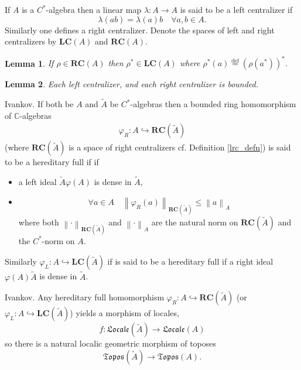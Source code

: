 \documentclass{beamer}
\theoremstyle{plain}
\newtheorem{lem}{Lemma}%
\newcommand{\bean}{\begin{eqnarray*}}
\newcommand{\eean}{\end{eqnarray*}}
\newcommand{\be}{\begin{equation}}
\newcommand{\ee}{\end{equation}}
\newcommand{\C}{\mathbb{C}}
\newcommand{\la}{\lambda}
\newcommand{\bydef}{\stackrel{\mathrm{def}}{=}}
\newcommand{\hookto}{\hookrightarrow}        %
\begin{document}
\begin{frame}
	\begin{definition}\label{lrc_defn}
	If $A$ is a $C^*$-algebra then a linear map $\la: A\to A$ is said to be a \alert{left centralizer} if
	\be
	\la\left(ab\right)= 	\la\left(a\right) b \quad \forall a, b \in A.
	\ee
	Similarly one defines a \alert{right} centralizer. Denote the spaces of left and right centralizers by $\mathbf{LC}(A)$ and  $\mathbf{RC}(A)$.
\end{definition}
\begin{lem}
	If $\rho\in  \mathbf{RC}(A)$ then $\rho^*\in  \mathbf{LC}(A)$ where $\rho^*\left(a \right)\bydef \left(\rho\left( a^* \right) \right)^*$. 
\end{lem}


\begin{lem}\label{lrc_lem}
	Each left centralizer, and each right centralizer is bounded.
\end{lem}

\end{frame}
\begin{frame}
\begin{definition}\label{hereditary_full_defn}
\alert{Ivankov}.	If both be $A$ and $\widetilde{A}$ be $C^*$-algebras then  a bounded ring homomorphism of $\C$-algebras
	\bean
	\varphi_R: A \hookto \mathbf{RC}\left(\widetilde A\right)
	\eean
	(where $\mathbf{RC}\left(\widetilde A\right)$ is a space of right centralizers cf. Definition \ref{lrc_defn}) is said to be a \alert{hereditary full} if 
	if 
	\begin{itemize}
		\item  a left ideal $\widetilde{A} \varphi\left(A \right)$  is dense in $\widetilde{A}$,
		\item 
		$$
		\forall a \in A \quad \left\|\varphi_R\left( a \right)  \right\|_{\mathbf{RC}\left(\widetilde A\right)} \le  \left\|a \right\|_{A}
		$$
		where both $\left\|\cdot  \right\|_{\mathbf{RC}\left(\widetilde A\right)}$ and $\left\|\cdot  \right\|_{A}$ are the natural norm on $\mathbf{RC}\left(\widetilde A\right)$ and the $C^*$-norm on $A$.
\end{itemize}	
	Similarly $\varphi_L: A \hookto \mathbf{LC}\left(\widetilde A\right)$ if is said to be a \alert{hereditary full} if  a right ideal $ \varphi\left(A \right)\widetilde{A}$  is dense in $\widetilde{A}$.
	
\end{definition}
\end{frame}
\begin{frame}
\begin{lemma}\label{locale_lem} 
\alert{Ivankov}.	Any hereditary full homomorphism $\varphi_R: A \hookto \mathbf{RC}\left(\widetilde A\right)$ (or $\varphi_L: A \hookto \mathbf{LC}\left(\widetilde A\right)$)  yields a morphism of locales,
	$$
f: \mathfrak{Locale}\left( \widetilde A\right)\xrightarrow{ }\mathfrak{Locale}\left( A\right)
	$$
so there is  a natural localic geometric  morphism of toposes 
	$$\mathfrak{Topos}\left( \widetilde A\right)\xrightarrow{}\mathfrak{Topos}\left( A\right).$$ 
\end{lemma}
\end{frame}
\end{document}
